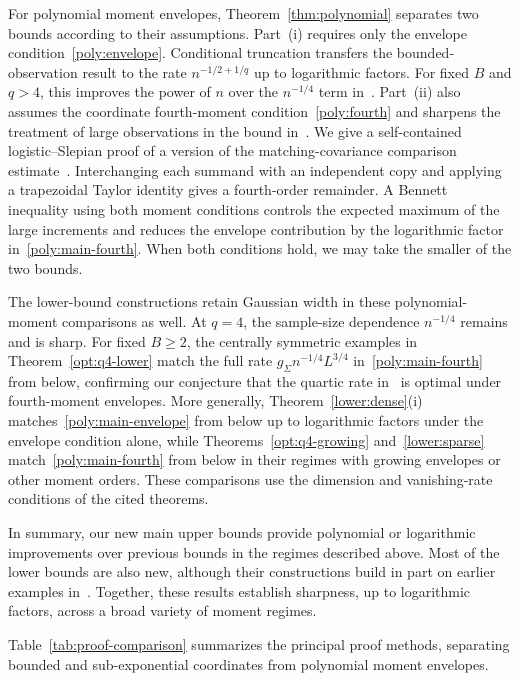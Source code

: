 \documentclass[11pt,letterpaper]{article}
\newcommand{\vSix}[1]{{\color{magenta}#1}}
\theoremstyle{remark}
\begin{document}
{For polynomial moment envelopes,
Theorem~\ref{thm:polynomial} separates two bounds according to their
assumptions. Part~\textup{(i)} requires only the envelope
condition~\eqref{poly:envelope}. Conditional truncation transfers the
bounded-observation result to the rate \(n^{-1/2+1/q}\) up to
logarithmic factors. For fixed \(B\) and \(q>4\), this improves the
power of \(n\) over the \(n^{-1/4}\) term
in~\cite[Theorem~2.5]{CCKK2022}. Part~\textup{(ii)} also assumes the
coordinate fourth-moment condition~\eqref{poly:fourth} and sharpens
 the treatment of large observations in the bound in~\cite{CCKK2022}.
We give a self-contained logistic--Slepian proof of a version of the
matching-covariance comparison estimate~\cite[Lemma~A.1]{CCKK2022}. Interchanging each
summand with an independent copy and applying a trapezoidal Taylor
identity gives a fourth-order remainder. A Bennett inequality using
both moment conditions controls the expected maximum of the large
increments and reduces the envelope contribution by the logarithmic
factor in~\eqref{poly:main-fourth}. When both conditions hold, we may
take the smaller of the two bounds.}

\vSix{The lower-bound constructions retain Gaussian width in
these polynomial-moment comparisons as well.}
{At \(q=4\), the sample-size dependence
\(n^{-1/4}\) remains and is sharp. For fixed \(B\ge2\), the centrally
symmetric examples in Theorem~\ref{opt:q4-lower} match the full rate
\vSix{\(g_\Sigma n^{-1/4}L^{3/4}\)} in~\eqref{poly:main-fourth} from below,
confirming our conjecture that the quartic rate
in~\cite[Theorem~2.5]{CCKK2022} is optimal under fourth-moment
envelopes. More generally, Theorem~\ref{lower:dense}\textup{(i)}
matches~\eqref{poly:main-envelope} from below up to logarithmic
factors under the envelope condition alone, while
Theorems~\ref{opt:q4-growing} and~\ref{lower:sparse}
match~\eqref{poly:main-fourth} from below in their regimes with
growing envelopes or other moment orders. These comparisons use the
dimension and vanishing-rate conditions of the cited theorems.}

{In summary, our new main upper bounds provide
polynomial or logarithmic improvements over previous bounds in the
regimes described above. Most of the lower bounds are also new,
although their constructions build in part on earlier examples
in~\cite{CCK,FKLZ}. Together, these results establish sharpness,
up to logarithmic factors, across a broad variety of moment regimes.}

{Table~\ref{tab:proof-comparison} summarizes
the principal proof methods, separating bounded and sub-exponential
coordinates from polynomial moment envelopes.}
\end{document}
